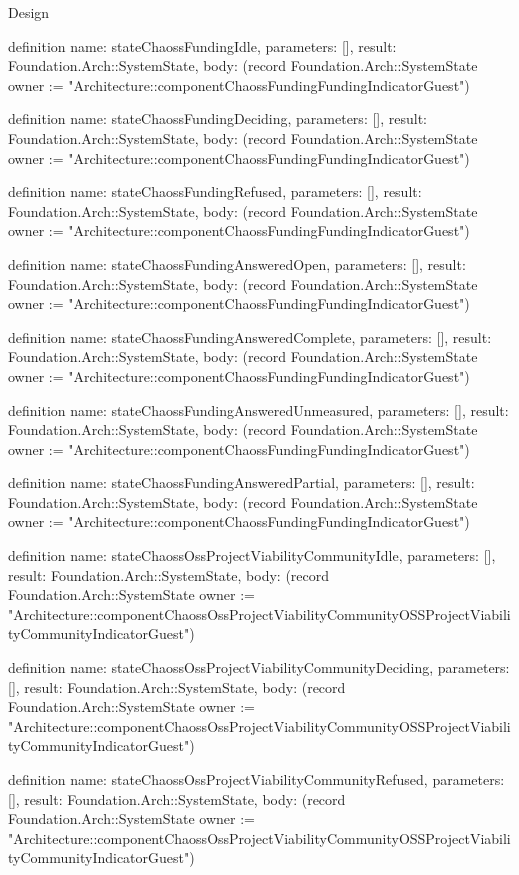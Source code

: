 \begin{lexlean}{Design}
\begin{semanticmodule}
definition{
  name: stateChaossFundingIdle,
  parameters: [],
  result: Foundation.Arch::SystemState,
  body: (record Foundation.Arch::SystemState {owner := "Architecture::componentChaossFundingFundingIndicatorGuest"})
}

definition{
  name: stateChaossFundingDeciding,
  parameters: [],
  result: Foundation.Arch::SystemState,
  body: (record Foundation.Arch::SystemState {owner := "Architecture::componentChaossFundingFundingIndicatorGuest"})
}

definition{
  name: stateChaossFundingRefused,
  parameters: [],
  result: Foundation.Arch::SystemState,
  body: (record Foundation.Arch::SystemState {owner := "Architecture::componentChaossFundingFundingIndicatorGuest"})
}

definition{
  name: stateChaossFundingAnsweredOpen,
  parameters: [],
  result: Foundation.Arch::SystemState,
  body: (record Foundation.Arch::SystemState {owner := "Architecture::componentChaossFundingFundingIndicatorGuest"})
}

definition{
  name: stateChaossFundingAnsweredComplete,
  parameters: [],
  result: Foundation.Arch::SystemState,
  body: (record Foundation.Arch::SystemState {owner := "Architecture::componentChaossFundingFundingIndicatorGuest"})
}

definition{
  name: stateChaossFundingAnsweredUnmeasured,
  parameters: [],
  result: Foundation.Arch::SystemState,
  body: (record Foundation.Arch::SystemState {owner := "Architecture::componentChaossFundingFundingIndicatorGuest"})
}

definition{
  name: stateChaossFundingAnsweredPartial,
  parameters: [],
  result: Foundation.Arch::SystemState,
  body: (record Foundation.Arch::SystemState {owner := "Architecture::componentChaossFundingFundingIndicatorGuest"})
}

definition{
  name: stateChaossOssProjectViabilityCommunityIdle,
  parameters: [],
  result: Foundation.Arch::SystemState,
  body: (record Foundation.Arch::SystemState {owner := "Architecture::componentChaossOssProjectViabilityCommunityOSSProjectViabilityCommunityIndicatorGuest"})
}

definition{
  name: stateChaossOssProjectViabilityCommunityDeciding,
  parameters: [],
  result: Foundation.Arch::SystemState,
  body: (record Foundation.Arch::SystemState {owner := "Architecture::componentChaossOssProjectViabilityCommunityOSSProjectViabilityCommunityIndicatorGuest"})
}

definition{
  name: stateChaossOssProjectViabilityCommunityRefused,
  parameters: [],
  result: Foundation.Arch::SystemState,
  body: (record Foundation.Arch::SystemState {owner := "Architecture::componentChaossOssProjectViabilityCommunityOSSProjectViabilityCommunityIndicatorGuest"})
}


\end{semanticmodule}
\end{lexlean}
